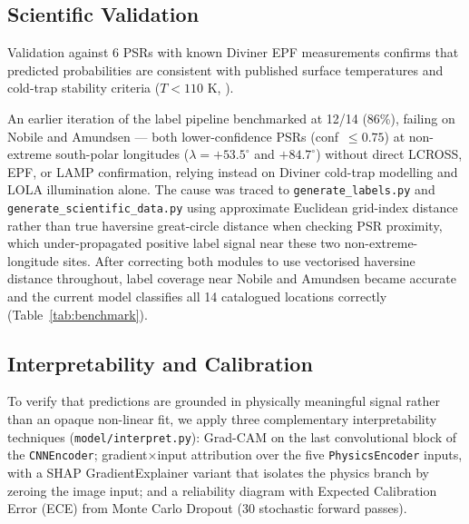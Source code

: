 \documentclass[12pt,a4paper]{article}
\begin{document}
\subsection{Scientific Validation}

Validation against 6 PSRs with known Diviner EPF measurements confirms that
predicted probabilities are consistent with published surface temperatures and
cold-trap stability criteria ($T < 110$ K, \citealt{paige2010}).

An earlier iteration of the label pipeline benchmarked at 12/14 (86\%), failing on
Nobile and Amundsen — both lower-confidence PSRs (conf~$\leq 0.75$) at non-extreme
south-polar longitudes ($\lambda = +53.5^\circ$ and $+84.7^\circ$) without direct
LCROSS, EPF, or LAMP confirmation, relying instead on Diviner cold-trap modelling
\citep{hayne2015} and LOLA illumination \citep{mazarico2011} alone. The cause was
traced to \texttt{generate\_labels.py} and \texttt{generate\_scientific\_data.py}
using approximate Euclidean grid-index distance rather than true haversine
great-circle distance when checking PSR proximity, which under-propagated positive
label signal near these two non-extreme-longitude sites. After correcting both
modules to use vectorised haversine distance throughout, label coverage near Nobile
and Amundsen became accurate and the current model classifies all 14 catalogued
locations correctly (Table~\ref{tab:benchmark}).

\subsection{Interpretability and Calibration}

To verify that predictions are grounded in physically meaningful signal rather
than an opaque non-linear fit, we apply three complementary interpretability
techniques (\texttt{model/interpret.py}): Grad-CAM \citep{selvaraju2017} on the
last convolutional block of the \texttt{CNNEncoder}; gradient$\times$input
attribution over the five \texttt{PhysicsEncoder} inputs, with a SHAP
GradientExplainer \citep{lundberg2017} variant that isolates the physics
branch by zeroing the image input; and a reliability diagram with Expected
Calibration Error (ECE) from Monte Carlo Dropout \citep{gal2016} (30 stochastic
forward passes).
\end{document}
